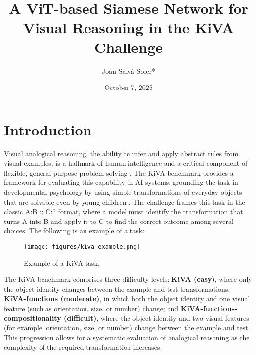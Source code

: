 \documentclass[twocolumn]{article} %
\date{October 7, 2025}
\title{A ViT-based Siamese Network for Visual Reasoning in the KiVA Challenge }
\author[1]{Joan Salvà Soler*\orcidA{}}
\affil[1]{H2O.ai}
\begin{document}



\section{Introduction}

Visual analogical reasoning, the ability to infer and apply abstract rules from visual examples, is a hallmark of human intelligence and a critical component of flexible, general-purpose problem-solving \cite{gentner1983}. The KiVA benchmark provides a framework for evaluating this capability in AI systems, grounding the task in developmental psychology by using simple transformations of everyday objects that are solvable even by young children \cite{yee2025kiva}. The challenge frames this task in the classic A:B :: C:? format, where a model must identify the transformation that turns A into B and apply it to C to find the correct outcome among several choices. The following is an example of a task:

\begin{figure}[h]\vspace{-0.5\baselineskip}
    \centering
    \texttt{[image: figures/kiva-example.png]}
    \caption{Example of a KiVA task.}
    \label{fig:kiva_example}
\end{figure}\vspace{-0.5\baselineskip}

The KiVA benchmark comprises three difficulty levels: \textbf{KiVA (easy)}, where only the object identity changes between the example and test transformations; \textbf{KiVA-functions (moderate)}, in which both the object identity and one visual feature (such as orientation, size, or number) change; and \textbf{KiVA-functions-compositionality (difficult)}, where the object identity and two visual features (for example, orientation, size, or number) change between the example and test. This progression allows for a systematic evaluation of analogical reasoning as the complexity of the required transformation increases.
\end{document}
